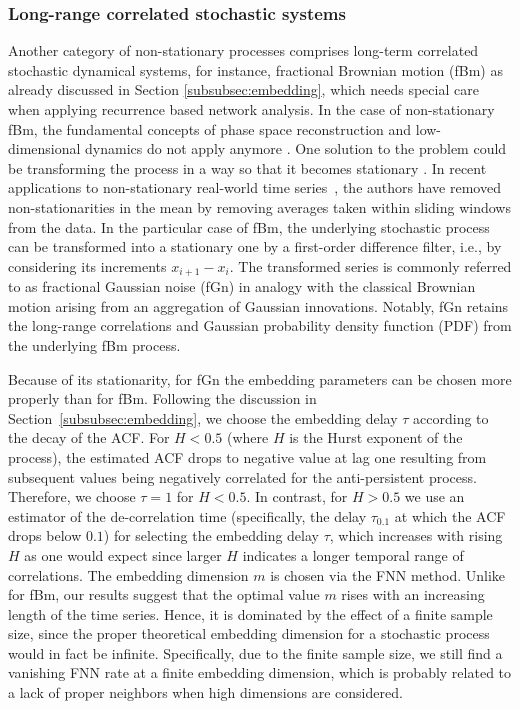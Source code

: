         \subsubsection{Long-range correlated stochastic systems}

		Another category of non-stationary processes comprises long-term correlated stochastic dynamical systems, for instance, fractional Brownian motion (fBm) as already discussed in Section \ref{subsubsec:embedding}, which needs special care when applying recurrence based network analysis. In the case of non-stationary fBm, the fundamental concepts of phase space reconstruction and low-dimensional dynamics do not apply anymore \cite{Zou2015}. One solution to the problem could be transforming the process in a way so that it becomes stationary \cite{Zou2015}. In recent applications to non-stationary real-world time series~\cite{Donges2011,Donges2011a}, the authors have removed non-stationarities in the mean by removing averages taken within sliding windows from the data. In the particular case of fBm, the underlying stochastic process can be transformed into a stationary one by a first-order difference filter, i.e., by considering its increments $x_{i+1}- x_i$. The transformed series is commonly referred to as fractional Gaussian noise (fGn) in analogy with the classical Brownian motion arising from an aggregation of Gaussian innovations. Notably, fGn retains the long-range correlations and Gaussian probability density function (PDF) from the underlying fBm process.

		Because of its stationarity, for fGn the embedding parameters can be chosen more properly than for fBm. Following the discussion in Section~\ref{subsubsec:embedding}, we choose the embedding delay $\tau$ according to the decay of the ACF. For $H < 0.5$ (where $H$ is the Hurst exponent of the process), the estimated ACF drops to negative value at lag one resulting from subsequent values being negatively correlated for the anti-persistent process. Therefore, we choose $\tau = 1$ for $H < 0.5$. In contrast, for $H > 0.5$ we use an estimator of the de-correlation time (specifically, the delay $\tau_{0.1}$ at which the ACF drops below $0.1$) for selecting the embedding delay $\tau$, which increases with rising $H$ as one would expect since larger $H$ indicates a longer temporal range of correlations. The embedding dimension $m$ is chosen via the FNN method. Unlike for fBm, our results suggest that the optimal value $m$ rises with an increasing length of the time series. Hence, it is dominated by the effect of a finite sample size, since the proper theoretical embedding dimension for a stochastic process would in fact be infinite. Specifically, due to the finite sample size, we still find a vanishing FNN rate at a finite embedding dimension, which is probably related to a lack of proper neighbors when high dimensions are considered.

